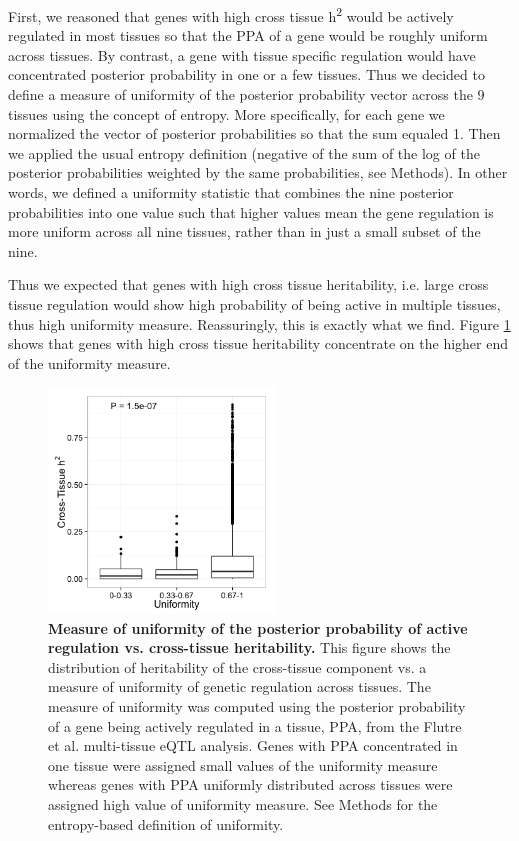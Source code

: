 \documentclass[10pt,letterpaper]{article}
\begin{document}
First, we reasoned that genes with high cross tissue h\textsuperscript{2} would be actively regulated in most tissues so that the PPA of a gene would be roughly uniform across tissues. By contrast, a gene with tissue specific regulation would have concentrated posterior probability in one or a few tissues. Thus we decided to define a measure of uniformity of the posterior probability vector across the 9 tissues using the concept of entropy. More specifically, for each gene we normalized the vector of posterior probabilities so that the sum equaled 1. Then we applied the usual entropy definition (negative of the sum of the log of the posterior probabilities weighted by the same probabilities, see Methods). In other words, we defined a uniformity statistic that combines the nine posterior probabilities into one value such that higher values mean the gene regulation is more uniform across all nine tissues, rather than in just a small subset of the nine.

Thus we expected that genes with high cross tissue heritability, i.e. large cross tissue regulation would show high probability of being active in multiple tissues, thus high uniformity measure. Reassuringly, this is exactly what we find.
Figure \ref{fig-ct-entropy} shows that genes with high cross tissue heritability concentrate on the higher end of the uniformity measure. 

\begin{figure}[H]
\includegraphics[width=6cm]{Figures/Fig-CT-entropy.png}
\caption{{\bf Measure of uniformity of the posterior probability of active regulation vs. cross-tissue heritability.}
This figure shows the distribution of heritability of the cross-tissue component vs. a measure of uniformity of genetic regulation across tissues. 
The measure of uniformity was computed using the posterior probability of a gene being actively regulated in a tissue, PPA, from the Flutre et al. \cite{Flutre_2013} multi-tissue eQTL analysis. Genes with PPA concentrated in one tissue were assigned small values of the uniformity measure whereas genes with PPA uniformly distributed across tissues were assigned high value of uniformity measure. See Methods for the entropy-based definition of uniformity.}
\label{fig-ct-entropy}
\end{figure}
\end{document}
